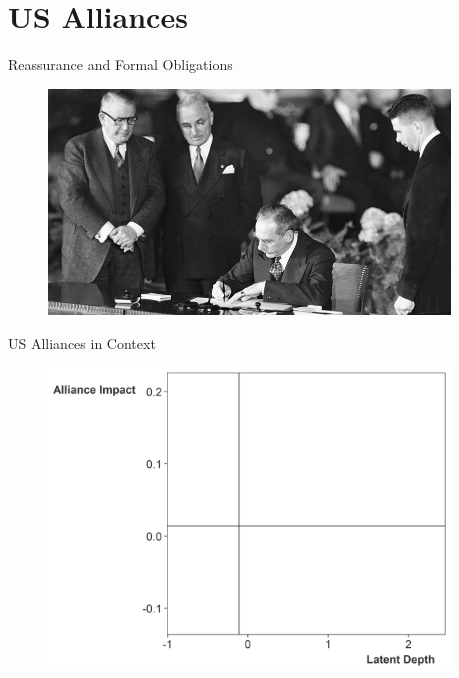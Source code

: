 \documentclass[12pt]{beamer}
\begin{document}

\section{US Alliances}


\begin{frame}{Reassurance and Formal Obligations}

\begin{figure}
	\centering
		\includegraphics[width=0.95\textwidth]{acheson-nato-sign.jpg}
	\label{fig:acheson-nato-sign}
\end{figure}


\end{frame}




\begin{frame}{US Alliances in Context} 

\begin{figure}
	\centering
		\includegraphics[width=0.95\textwidth]{lambda-depth-us-blank.png}
\end{figure}


 \end{frame}
 
\end{document}
